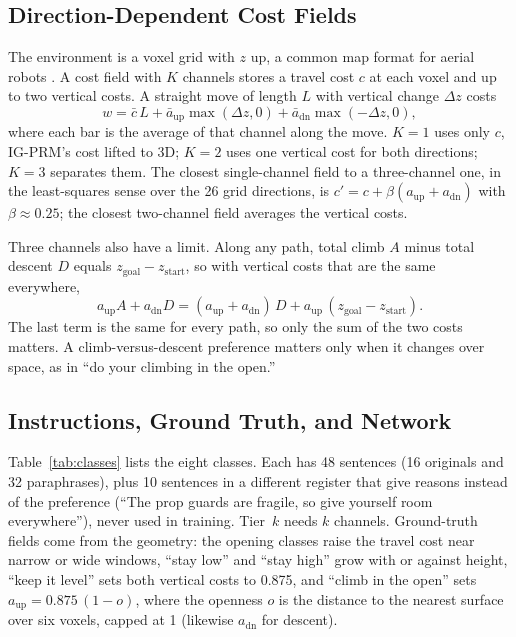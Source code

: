 \documentclass[conference]{IEEEtran}
\begin{document}
\subsection{Direction-Dependent Cost Fields}
The environment is a voxel grid with $z$ up, a common map format for aerial robots \cite{hornung2013octomap}. A cost field with $K$ channels stores a travel cost $c$ at each voxel and up to two vertical costs. A straight move of length $L$ with vertical change $\Delta z$ costs
\begin{equation}
w = \bar{c}\,L + \bar{a}_{\mathrm{up}}\max(\Delta z,0) + \bar{a}_{\mathrm{dn}}\max(-\Delta z,0), \label{eq:cost}
\end{equation}
where each bar is the average of that channel along the move. $K=1$ uses only $c$, IG-PRM's cost lifted to 3D; $K=2$ uses one vertical cost for both directions; $K=3$ separates them. The closest single-channel field to a three-channel one, in the least-squares sense over the 26 grid directions, is $c' = c + \beta(a_{\mathrm{up}}+a_{\mathrm{dn}})$ with $\beta \approx 0.25$; the closest two-channel field averages the vertical costs.

Three channels also have a limit. Along any path, total climb $A$ minus total descent $D$ equals $z_{\mathrm{goal}} - z_{\mathrm{start}}$, so with vertical costs that are the same everywhere,
\begin{equation}
a_{\mathrm{up}}A + a_{\mathrm{dn}}D = (a_{\mathrm{up}}+a_{\mathrm{dn}})\,D + a_{\mathrm{up}}\,(z_{\mathrm{goal}}-z_{\mathrm{start}}). \label{eq:degen}
\end{equation}
The last term is the same for every path, so only the sum of the two costs matters. A climb-versus-descent preference matters only when it changes over space, as in ``do your climbing in the open.''

\subsection{Instructions, Ground Truth, and Network}
Table~\ref{tab:classes} lists the eight classes. Each has 48 sentences (16 originals and 32 paraphrases), plus 10 sentences in a different register that give reasons instead of the preference (``The prop guards are fragile, so give yourself room everywhere''), never used in training. Tier~$k$ needs $k$ channels. Ground-truth fields come from the geometry: the opening classes raise the travel cost near narrow or wide windows, ``stay low'' and ``stay high'' grow with or against height, ``keep it level'' sets both vertical costs to 0.875, and ``climb in the open'' sets $a_{\mathrm{up}} = 0.875\,(1-o)$, where the openness $o$ is the distance to the nearest surface over six voxels, capped at 1 (likewise $a_{\mathrm{dn}}$ for descent).
\end{document}
